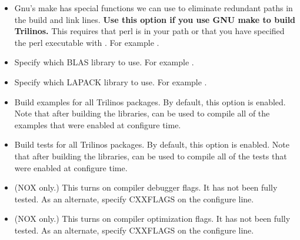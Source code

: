 \begin{itemize}

\item {}

Gnu's make has special functions we can use to eliminate redundant
paths in the build and link lines. {\bf Use this option if you use
GNU make to build Trilinos.}  This requires that perl is in your path
or that you have specified the perl executable with
.  For example
.

\item {}

Specify which BLAS library to use.  For example \newline
{}.

\item {}

Specify which LAPACK library to use.  For example \newline
{}.

\item {}

Build examples for all Trilinos packages.  By default, this option is enabled.
Note that after building the libraries, 
can be used to compile all of the examples that were enabled at configure time.

\item {}

Build tests for all Trilinos packages.  By default, this option is enabled.
Note that after building the libraries, 
can be used to compile all of the tests that were enabled at configure time.

\item {}

(NOX only.)  This turns on compiler debugger flags. It has
not been fully tested. As an alternate, specify CXXFLAGS on the
                 configure line.

\item {}

(NOX only.)  This turns on compiler optimization flags. It
has not been fully tested. As an alternate, specify CXXFLAGS on the
                 configure line.


\end{itemize}
